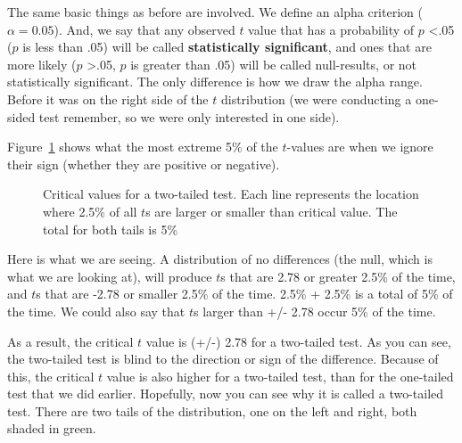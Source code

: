 \documentclass[
  letterpaper,
  DIV=11,
  numbers=noendperiod]{scrreprt}
\begin{document}
The same basic things as before are involved. We define an alpha
criterion (\(\alpha = 0.05\)). And, we say that any observed \(t\) value
that has a probability of \(p\) \textless.05 (\(p\) is less than .05)
will be called \textbf{statistically significant}, and ones that are
more likely (\(p\) \textgreater.05, \(p\) is greater than .05) will be
called null-results, or not statistically significant. The only
difference is how we draw the alpha range. Before it was on the right
side of the \(t\) distribution (we were conducting a one-sided test
remember, so we were only interested in one side).

Figure~\ref{fig-7twotailedt} shows what the most extreme 5\% of the
\(t\)-values are when we ignore their sign (whether they are positive or
negative).

\begin{figure}


\caption{\label{fig-7twotailedt}Critical values for a two-tailed test.
Each line represents the location where 2.5\% of all \(t\)s are larger
or smaller than critical value. The total for both tails is 5\%}

\end{figure}%

Here is what we are seeing. A distribution of no differences (the null,
which is what we are looking at), will produce \(t\)s that are 2.78 or
greater 2.5\% of the time, and \(t\)s that are -2.78 or smaller 2.5\% of
the time. 2.5\% + 2.5\% is a total of 5\% of the time. We could also say
that \(t\)s larger than +/- 2.78 occur 5\% of the time.

As a result, the critical \(t\) value is (+/-) 2.78 for a two-tailed
test. As you can see, the two-tailed test is blind to the direction or
sign of the difference. Because of this, the critical \(t\) value is
also higher for a two-tailed test, than for the one-tailed test that we
did earlier. Hopefully, now you can see why it is called a two-tailed
test. There are two tails of the distribution, one on the left and
right, both shaded in green.
\end{document}
